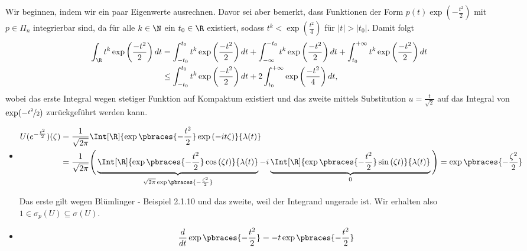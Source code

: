 \begin{solution}

Wir beginnen, indem wir ein paar Eigenwerte ausrechnen.
Davor sei aber bemerkt, dass Funktionen der Form $p(t)\exp(-\frac{t^2}{2})$ mit $p \in \Pi_n$ integrierbar sind, da für alle $k \in \N$
ein $t_0 \in \R$ existiert, sodass $t^k < \exp(\frac{t^2}{4})$ für $|t| > |t_0|$. Damit folgt
\begin{align*}
  \int_\R t^k \exp\left(\frac{-t^2}{2}\right) dt &= \int_{-t_0}^{t_0} t^k \exp\left(\frac{-t^2}{2}\right) dt
  + \int_{-\infty}^{-t_0} t^k \exp\left(\frac{-t^2}{2}\right) dt + \int_{t_0}^{+\infty} t^k \exp\left(\frac{-t^2}{2}\right) dt\\
  &\leq \int_{-t_0}^{t_0} t^k \exp\left(\frac{-t^2}{2}\right) dt + 2\int_{t_0}^{+\infty}\exp\left(\frac{-t^2}{4}\right)  dt,
\end{align*}
wobei das erste Integral wegen stetiger Funktion auf Kompaktum existiert und
das zweite mittels Substitution $u = \frac{t}{\sqrt{2}}$ auf das Integral von $\exp(-\nicefrac{t^2}{2})$
zurückgeführt werden kann.
\FloatBarrier
\begin{itemize}
  \item
  \begin{align*}
    U(e^{-\frac{t^2}{2}})(\zeta)
    & =
    \frac{1}{\sqrt{2 \pi}}
    \Int[\R]
    {
      \exp \pbraces{-\frac{t^2}{2}}
      \exp{(-i t \zeta)}
    }
    {\lambda(t)} \\
    & =
    \frac{1}{\sqrt{2 \pi}}
    \Bigg (
      \underbrace
      {
      \Int[\R]
      {
      \exp \pbraces{-\frac{t^2}{2}}
      \cos{(\zeta t)}
      }
      {\lambda(t)}
      }_{
      \sqrt{2 \pi}
      \exp \pbraces{-\frac{\zeta^2}{2}}
      } -
      i
      \underbrace
      {
      \Int[\R]
      {
      \exp \pbraces{-\frac{t^2}{2}}
      \sin{(\zeta t)}
      }
      {\lambda(t)}
      }_0
    \Bigg )
    =
    \exp \pbraces{-\frac{\zeta^2}{2}}
  \end{align*}

  Das erste  gilt wegen Blümlinger - Beispiel 2.1.10 und das zweite, weil der Integrand ungerade ist.
  Wir erhalten also $1 \in \sigma_p(U) \subseteq \sigma(U)$.
  \FloatBarrier
  \FloatBarrier
  \item
  \begin{align*}
    \frac{d}{dt}
    \exp \pbraces{-\frac{t^2}{2}}
    =
    -t \exp \pbraces{-\frac{t^2}{2}}
  \end{align*}




\end{itemize}
\end{solution}
